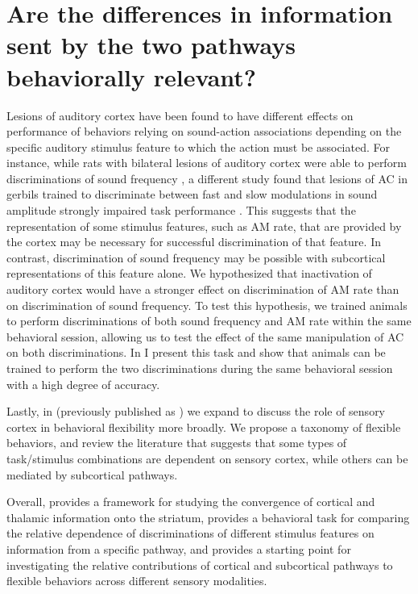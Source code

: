 \section{Are the differences in information sent by the two pathways behaviorally relevant?}
Lesions of auditory cortex have been found to have different effects on performance of behaviors relying on sound-action associations depending on the specific auditory stimulus feature to which the action must be associated.
%
For instance, while rats with bilateral lesions of auditory cortex were able to perform discriminations of sound frequency \citep{Gimenez2015}, a different study found that lesions of AC in gerbils trained to discriminate between fast and slow modulations in sound amplitude strongly impaired task performance \citep{Deutscher2006}.
%
This suggests that the representation of some stimulus features, such as AM rate, that are provided by the cortex may be necessary for successful discrimination of that feature.
%
In contrast, discrimination of sound frequency may be possible with subcortical representations of this feature alone.
%
We hypothesized that inactivation of auditory cortex would have a stronger effect on discrimination of AM rate than on discrimination of sound frequency.
%
To test this hypothesis, we trained animals to perform discriminations of both sound frequency and AM rate within the same behavioral session, allowing us to test the effect of the same manipulation of AC on both discriminations.
In \ch{\Amod} I present this task and show that animals can be trained to perform the two discriminations during the same behavioral session with a high degree of accuracy.
%

Lastly, in \ch{\Rev} (previously published as \citet{Guo2017}) we expand to discuss the role of sensory cortex in behavioral flexibility more broadly.
%
We propose a taxonomy of flexible behaviors, and review the literature that suggests that some types of task/stimulus combinations are dependent on sensory cortex, while others can be mediated by subcortical pathways.

Overall, \ch{\Thstr} provides a framework for studying the convergence of cortical and thalamic information onto the striatum, \ch{\Amod} provides a behavioral task for comparing the relative dependence of discriminations of different stimulus features on information from a specific pathway, and \ch{\Rev} provides a starting point for investigating the relative contributions of cortical and subcortical pathways to flexible behaviors across different sensory modalities. 

